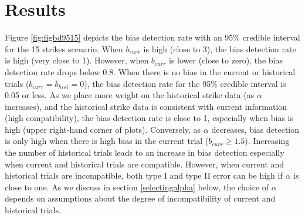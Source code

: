 \documentclass[12pt]{article}
\begin{document}
\hypertarget{results}{%
\section{Results}\label{results}}

Figure \ref{fig:figbd9515} depicts the bias detection rate with an 95\% credible interval for the 15 strikes scenario. When \(b_{curr}\) is high (close to 3), the bias detection rate is high (very close to 1). However, when \(b_{curr}\) is lower (close to zero), the bias detection rate drops below 0.8. When there is no bias in the current or historical trials (\(b_{curr} = b_{hist} = 0\)), the bias detection rate for the 95\% credible interval is 0.05 or less. As we place more weight on the historical strike data (as \(\alpha\) increases), and the historical strike data is consistent with current information (high compatibility), the bias detection rate is close to 1, especially when bias is high (upper right-hand corner of plots). Conversely, as \(\alpha\) decreases, bias detection is only high when there is high bias in the current trial (\(b_{curr} \geq 1.5\)). Increasing the number of historical trials leads to an increase in bias detection especially when current and historical trials are compatible. However, when current and historical trials are incompatible, both type I and type II error can be high if \(\alpha\) is close to one. As we discuss in section \ref{selectingalpha} below, the choice of \(\alpha\) depends on assumptions about the degree of incompatibility of current and historical trials.
\end{document}
